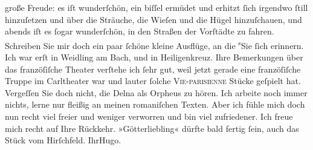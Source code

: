 \begin{ledgroupsized}[t]{13cm}
               große Freude: es iſt wunderſchön, ein biſſel ermüdet und erhitzt ſich irgendwo ſtill
               hinzuſetzen {\pb}und über die
               Sträuche, die Wieſen und die Hügel hinzuſchauen, und abends iſt es ſogar wunderſchön,
               in den Straßen der Vorſtädte zu fahren.\pend
           \pstart
           Schreiben Sie mir doch ein paar ſchöne kleine Ausflüge, an die \substVorne{}\textsuperscript{s}\substDazwischen{}S\substHinten{}ie ſich erinnern. Ich war erſt in Weidling
                  am Bach, und in Heiligenkreuz.\pend
           \pstart
           Ihre Bemerkungen über das franzöſiſche Theater
               verſtehe ich ſehr gut, weil jetzt gerade {\pb}eine franzöſiſche Truppe im Carltheater war und lauter ſolche \textsc{Vie-parisienne}{ }Stücke geſpielt hat. Vergeſſen Sie doch nicht, die
                  Delna als Orpheus zu hören.\pend
           \pstart
           Ich arbeite noch immer nichts, lerne nur fleißig an meinen romaniſchen Texten. Aber
               ich fühle mich doch nun recht viel freier und weniger verworren und bin viel
               zufriedener.\pend
           \pstart
           Ich freue mich recht auf Ihre Rückkehr. »Götterliebling« dürfte bald fertig ſein, auch das Stück vom Hirſchfeld.\pend
           \pstart Ihr\spacefill\mbox{Hugo.}\pend{}
         
         \endnumbering{}\end{ledgroupsized}  \newcommand{\dateiname}{L00673}\newcommand{\titel}{Hugo von Hofmannsthal an Arthur Schnitzler, 2. 5. [1897]}\newcommand{\editorInnen}{Martin Anton Müller und Gerd-Hermann Susen}
      
